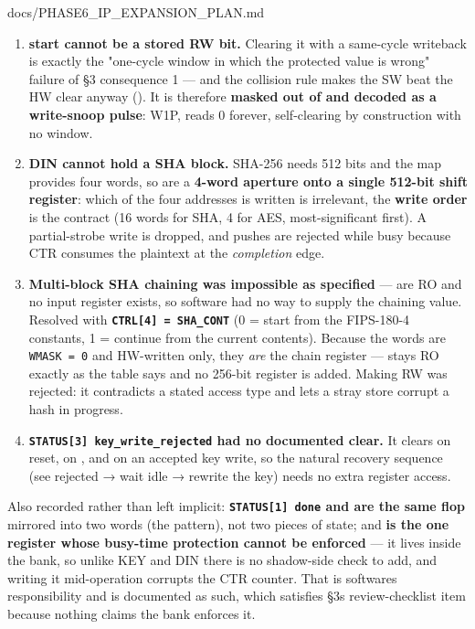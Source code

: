 \begin{relocated}{docs/PHASE6_IP_EXPANSION_PLAN.md}
\begin{enumerate}
\def\labelenumi{\arabic{enumi}.}
\tightlist
\item
  \textbf{ start cannot be a stored RW bit.} Clearing it
  with a same-cycle  writeback is exactly the "one-cycle
  window in which the protected value is wrong" failure of §3
  consequence 1 --- and the collision rule makes the SW  beat
  the HW clear anyway (). It is
  therefore \textbf{masked out of  and decoded as a
  write-snoop pulse}: W1P, reads 0 forever, self-clearing by
  construction with no window.
\item
  \textbf{DIN cannot hold a SHA block.} SHA-256 needs 512 bits and the
  map provides four words, so  are a \textbf{4-word
  aperture onto a single 512-bit shift register}: which of the four
  addresses is written is irrelevant, the \textbf{write order} is the
  contract (16 words for SHA, 4 for AES, most-significant first). A
  partial-strobe write is dropped, and pushes are rejected while busy
  because CTR consumes the plaintext at the \emph{completion} edge.
\item
  \textbf{Multi-block SHA chaining was impossible as specified} ---
   are RO and no  input register exists, so
  software had no way to supply the chaining value. Resolved with
  \textbf{\texttt{CTRL[4]\ =\allowbreak{}\ SHA\_\allowbreak{}CONT}} (0 =
  start from the FIPS-180-4  constants, 1 = continue from the
  current  contents). Because the  words are
  \texttt{WMASK\ =\allowbreak{}\ 0} and HW-written only, they \emph{are}
  the chain register ---  stays RO exactly as the table
  says and no 256-bit register is added. Making  RW was
  rejected: it contradicts a stated access type and lets a stray store
  corrupt a hash in progress.
\item
  \textbf{\texttt{STATUS[3]\ key\_\allowbreak{}write\_\allowbreak{}rejected}
  had no documented clear.} It clears on reset, on ,
  and on an accepted key write, so the natural recovery sequence (see
  rejected → wait idle → rewrite the key) needs no extra register
  access.
\end{enumerate}

Also recorded rather than left implicit:
\textbf{\texttt{STATUS[1]\ done} and  are the same
flop} mirrored into two words (the 
pattern), not two pieces of state; and \textbf{ is the one
register whose busy-time protection cannot be enforced} --- it lives
inside the bank, so unlike KEY and DIN there is no shadow-side check to
add, and writing it mid-operation corrupts the CTR counter. That is
software\textquotesingle s responsibility and is documented as such,
which satisfies §3\textquotesingle s review-checklist item because
nothing claims the bank enforces it.


\end{relocated}
